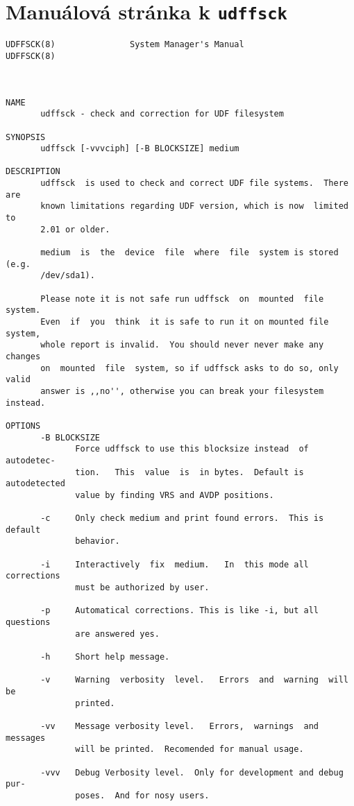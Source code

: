 \chapter{Manuálová stránka k \texttt{udffsck}}
\label{ch:manpage}
\begin{Verbatim}[fontsize=\footnotesize]
UDFFSCK(8)               System Manager's Manual               UDFFSCK(8)



NAME
       udffsck - check and correction for UDF filesystem

SYNOPSIS
       udffsck [-vvvciph] [-B BLOCKSIZE] medium

DESCRIPTION
       udffsck  is used to check and correct UDF file systems.  There are
       known limitations regarding UDF version, which is now  limited  to
       2.01 or older.

       medium  is  the  device  file  where  file  system is stored (e.g.
       /dev/sda1).

       Please note it is not safe run udffsck  on  mounted  file  system.
       Even  if  you  think  it is safe to run it on mounted file system,
       whole report is invalid.  You should never never make any  changes
       on  mounted  file  system, so if udffsck asks to do so, only valid
       answer is ,,no'', otherwise you can break your filesystem instead.

OPTIONS
       -B BLOCKSIZE
              Force udffsck to use this blocksize instead  of  autodetec-
              tion.   This  value  is  in bytes.  Default is autodetected
              value by finding VRS and AVDP positions.

       -c     Only check medium and print found errors.  This is  default
              behavior.

       -i     Interactively  fix  medium.   In  this mode all corrections
              must be authorized by user.

       -p     Automatical corrections. This is like -i, but all questions
              are answered yes.

       -h     Short help message.

       -v     Warning  verbosity  level.   Errors  and  warning  will  be
              printed.

       -vv    Message verbosity level.   Errors,  warnings  and  messages
              will be printed.  Recomended for manual usage.

       -vvv   Debug Verbosity level.  Only for development and debug pur-
              poses.  And for nosy users.


\end{Verbatim}

